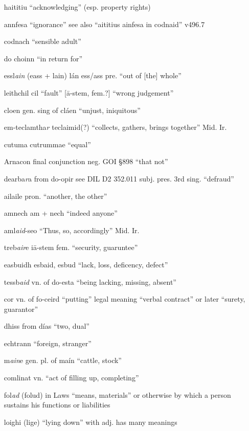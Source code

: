\documentclass[11pt]{article}
\begin{document}
\begin{enumerate}
  \item[haititiu] \enquote{acknowledging} (esp. property rights)
  \item[annfesa] \enquote{ignorance} see also \enquote{aititius ainfesa in codnaid} v496.7
  \item[codnach] \enquote{sensible adult}
  \item[do choinn] \enquote{in return for}
  \item[essl\emph{ain}] (eass + lain) l\'{a}n ess/ass pre. \enquote{out of [the] whole}
  \item[leithchil] cil \enquote{fault} [\={a}-stem, fem.?] \enquote{wrong judgement}
  \item[cloen] gen. sing of cl\'{a}en \enquote{unjust, iniquitous}
  \item[em-teclamtha\emph{r}] teclaimid(?) \enquote{collects, gathers, brings together} Mid. Ir.
  \item[cutuma] cutrummae \enquote{equal}
  \item[Arnacon] final conjunction neg. GOI \S 898 \enquote{that not}
  \item[dearba\emph{r}a] from do-opir see DIL D2 352.011 subj. pres. 3rd sing. \enquote{defraud} 
  \item[ailaile] pron. \enquote{another, the other}
  \item[amnech] am + nech \enquote{indeed anyone} 
  \item[aml\emph{aid}-seo] \enquote{Thus, so, accordingly} Mid. Ir.
  \item[treb\emph{air}e] i\={a}-stem fem. \enquote{security, guaruntee}
  \item[easbuidh] esbaid, esbud \enquote{lack, loss, deficency, defect}
  \item[tessb\emph{aid}] vn. of do-esta \enquote{being lacking, missing, absent}
  \item[cor] vn. of fo-ceird \enquote{putting} legal meaning \enquote{verbal contract} or later \enquote{surety, guarantor}
  \item[dhiss] from d\'{i}as \enquote{two, dual}
  \item[echtrann] \enquote{foreign, stranger}
  \item[m\emph{ain}e] gen. pl. of ma\'{i}n \enquote{cattle, stock}
  \item[comlinat] vn. \enquote{act of filling up, completing}
  \item[fol\emph{ad}] (folud) in Laws \enquote{means, materials} or otherwise by which a person sustains his functions or liabilities
  \item[loighi] (lige) \enquote{lying down} with adj. has many meanings

\end{enumerate}
\end{document}

